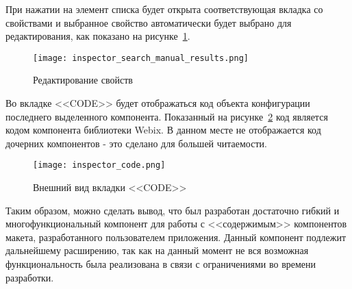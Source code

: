 При нажатии на элемент списка будет открыта соответствующая вкладка со свойствами и выбранное свойство автоматически будет выбрано для редактирования, как показано на рисунке~\ref{sec:manual:inspector_search_manual_results}.\pagebreak

\begin{figure}[ht]
  \centering
    \texttt{[image: inspector\_search\_manual\_results.png]}
    \caption{Редактирование свойств}
    \label{sec:manual:inspector_search_manual_results}
\end{figure}

Во вкладке <<CODE>> будет отображаться код объекта конфигурации последнего выделенного компонента. Показанный на рисунке~\ref{sec:manual:inspector_code} код является кодом компонента библиотеки Webix. В данном месте не отображается код дочерних компонентов - это сделано для большей читаемости.

\begin{figure}[ht]
  \centering
    \texttt{[image: inspector\_code.png]}
    \caption{Внешний вид вкладки <<CODE>>}
    \label{sec:manual:inspector_code}
\end{figure}

Таким образом, можно сделать вывод, что был разработан достаточно гибкий и многофункциональный компонент для работы с <<содержимым>> компонентов макета, разработанного пользователем приложения. Данный компонент подлежит дальнейшему расширению, так как на данный момент не вся возможная функциональность была реализована в связи с ограничениями во времени разработки.

